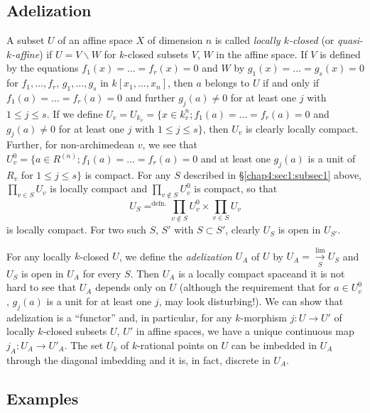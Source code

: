 \subsection{Adelization}\label{chap4:sec1:subsec2}%

A subset $U$ of an affine space $X$ of dimension $n$ is called {\em
  locally $k$-closed} (or {\em quasi-$k$-affine}) if $U=V\backslash W$
for $k$-closed subsets $V$, $W$ in the affine space. If $V$ is defined
by the equations $f_{1}(x)=\ldots=f_{r}(x)=0$ and $W$ by
$g_{1}(x)=\ldots=g_{s}(x)=0$ for $f_{1},\ldots,f_{r}$,
$g_{1},\ldots,g_{s}$ in $k[x_{1},\ldots,x_{n}]$, then $a$ belongs to
$U$ if and only if $f_{1}(a)=\ldots=f_{r}(a)=0$ and further
$g_{j}(a)\neq 0$ for at least one $j$ with $1\leq j\leq s$. If we
define $U_{v}=U_{k_{v}}=\{x\in k^{n}_{v};f_{1}(a)=\ldots=f_{r}(a)=0$
and $g_{j}(a)\neq 0$ for at least one $j$ with $1\leq j\leq s\}$, then
$U_{v}$ is clearly locally compact. Further, for non-archimedean $v$,
we see that $U^{0}_{v}=\{a\in R^{(n)};f_{1}(a)=\ldots=f_{r}(a)=0$ and
at least one $g_{j}(a)$ is a unit of $R_{v}$ for $1\leq j\leq s\}$ is
compact. For any $S$ described in \S \ref{chap4:sec1:subsec1} above,
$\prod\limits_{v\in S}U_{v}$ is locally compact and
$\prod\limits_{v\not\in S}U^{0}_{v}$ is compact, so that
$$
U_{S}{\displaystyle{\mathop{=}^{\text{defn.}}}}\prod_{v\not\in S}U^{0}_{v}\times
\prod_{v\in S}U_{v}
$$
is locally compact. For two such $S$, $S'$ with $S\subset S'$, clearly
$U_{S}$ is open in $U_{S'}$.

For any locally $k$-closed $U$, we define the {\em adelization}
$U_{A}$ of $U$ by $U_{A}=\xrightarrow[S]{\lim}U_{S}$ and $U_{S}$ is open in
$U_{A}$ for every $S$. Then $U_{A}$ is a locally compact
space\pageoriginale and it is not hard to see that $U_{A}$ depends
only on $U$ (although the requirement that for $a\in U^{0}_{v}$,
$g_{j}(a)$ is a unit for at least one $j$, may look disturbing!). We
can show that adelization is a ``functor'' and, in particular, for any
$k$-morphism $j:U\to U'$ of locally $k$-closed subsets $U$, $U'$ in
affine spaces, we have a unique continuous map $j_{A}:U_{A}\to
U'_{A}$. The set $U_{k}$ of $k$-rational points on $U$ can be imbedded
in $U_{A}$ through the diagonal imbedding and it is, in fact, discrete
in $U_{A}$.

\subsection{Examples}\label{chap4:sec1:subsec3} %

